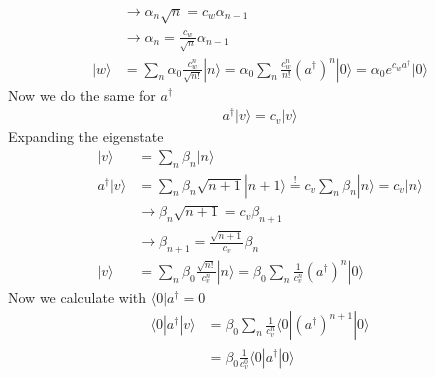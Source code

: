 \documentclass[10pt,a4paper]{book}
\theoremstyle{definition}
\begin{document}
\begin{enumerate}
\begin{align}
    &\rightarrow\alpha_n\sqrt{n}=c_w\alpha_{n-1}\\
    &\rightarrow\alpha_n=\frac{c_w}{\sqrt{n}}\alpha_{n-1}\\
    |w\rangle
    &=\sum_n\alpha_0\frac{c_w^n}{\sqrt{n!}}|n\rangle
    =\alpha_0\sum_n\frac{c_w^n}{n!}(a^\dagger)^n|0\rangle
    =\alpha_0 e^{c_wa^\dagger}|0\rangle
\end{align}
Now we do the same for $a^\dagger$
\begin{align}
    a^\dagger|v\rangle=c_v|v\rangle
\end{align}
Expanding the eigenstate 
\begin{align}
    |v\rangle
    &=\sum_n\beta_n|n\rangle\\
    a^\dagger|v\rangle
    &=\sum_n\beta_n\sqrt{n+1}|n+1\rangle\overset{!}{=}c_v\sum_n\beta_n|n\rangle=c_v|n\rangle\\
    &\rightarrow\beta_{n}\sqrt{n+1}=c_v\beta_{n+1}\\
    &\rightarrow\beta_{n+1}=\frac{\sqrt{n+1}}{c_v}\beta_{n}\\
    |v\rangle
    &=\sum_n\beta_0\frac{\sqrt{n!}}{c_v^n}|n\rangle=\beta_0\sum_n\frac{1}{c_v^n}(a^\dagger)^n|0\rangle
\end{align}
Now we calculate with $\langle 0|a^\dagger=0$
\begin{align}
    \langle 0|a^\dagger|v\rangle&=\beta_0\sum_n\frac{1}{c_v^n}\langle 0|(a^\dagger)^{n+1}|0\rangle\\
    &=\beta_0\frac{1}{c_v^0}\langle 0|a^\dagger|0\rangle\\
\end{align}
\end{enumerate}
\end{document}
